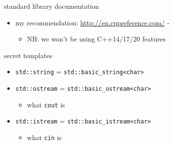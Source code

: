 \begin{frame}{standard library documentation}
    \begin{itemize}
    \item my recommendation: \url{http://en.cppreference.com/} -
        \begin{itemize}
        \item NB: we won't be using C++14/17/20 features
        \end{itemize}
    \end{itemize}
\end{frame}

\begin{frame}[fragile,label=secTemp]{secret templates}
    \begin{itemize}
    \item \lstinline|std::string| = \lstinline|std::basic_string<char>|
    \item \lstinline|std::ostream| = \lstinline|std::basic_ostream<char>|
    \begin{itemize}\item what \texttt{cout} is\end{itemize}
    \item \lstinline|std::istream| = \lstinline|std::basic_istream<char>|
    \begin{itemize}\item what \texttt{cin} is\end{itemize}
    \end{itemize}
\end{frame}
